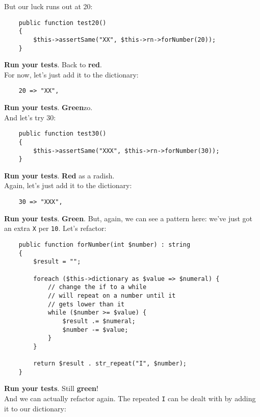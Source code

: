 But our luck runs out at 20:

\begin{verbatim}
    public function test20()
    {
        $this->assertSame("XX", $this->rn->forNumber(20));
    }
\end{verbatim}

\textbf{Run your tests}. Back to \textbf{red}.
\\

For now, let's just add it to the dictionary:

\begin{verbatim}
    20 => "XX",
\end{verbatim}

\textbf{Run your tests}. \textbf{Green}zo.
\\

And let's try 30:

\begin{verbatim}
    public function test30()
    {
        $this->assertSame("XXX", $this->rn->forNumber(30));
    }
\end{verbatim}

\textbf{Run your tests}. \textbf{Red} as a radish.
\\

Again, let's just add it to the dictionary:

\begin{verbatim}
    30 => "XXX",
\end{verbatim}

\textbf{Run your tests}. \textbf{Green}. But, again, we can see a pattern here: we've just got an extra \texttt{X} per \texttt{10}. Let's refactor:

\begin{verbatim}
    public function forNumber(int $number) : string
    {
        $result = "";

        foreach ($this->dictionary as $value => $numeral) {
            // change the if to a while
            // will repeat on a number until it
            // gets lower than it
            while ($number >= $value) {
                $result .= $numeral;
                $number -= $value;
            }
        }

        return $result . str_repeat("I", $number);
    }
\end{verbatim}

\textbf{Run your tests}. Still \textbf{green}!
\\

And we can actually refactor again. The repeated \texttt{I} can be dealt with by adding it to our dictionary:

